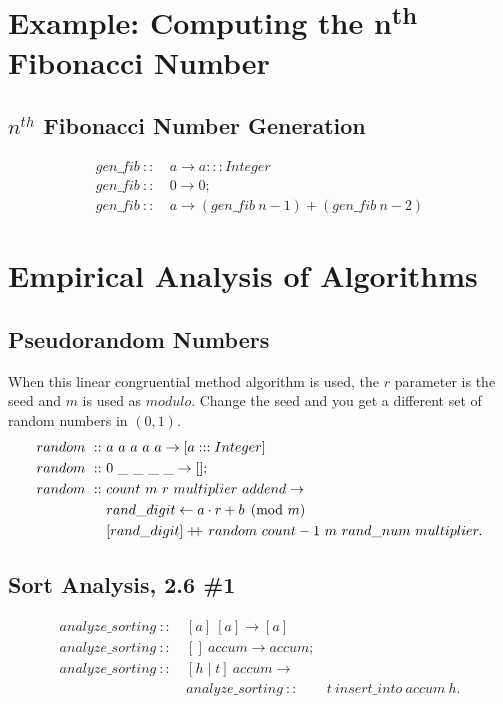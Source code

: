 \documentclass[a4paper,10pt]{book}
\newcommand\doubleplus{+\kern-1.3ex+\kern0.8ex}
\begin{document}
\section{Example: Computing the n\textsuperscript{th} Fibonacci Number}

\subsection{$n^{th}$ Fibonacci Number Generation}

\begin{align*}
gen\_fib\ ::\ &a\rightarrow a:::Integer\\
gen\_fib\ ::\ &0\rightarrow 0;\\
gen\_fib\ ::\ &a\rightarrow (gen\_fib\ n-1) + (gen\_fib\ n-2)
\end{align*}

\section{Empirical Analysis of Algorithms}
\subsection{Pseudorandom Numbers}

When this linear congruential method algorithm is used, the $r$ parameter is the seed and $m$ is used as $modulo$. Change the seed and you get a different set of random numbers in $(0,1)$.
\begin{align*}
random\ ::\ &a\ a\ a\ a\ a\rightarrow [a:::Integer]\\
random\ ::\ &0\ \_\ \_\ \_\ \_\rightarrow [];\\
random\ ::\ &count\ m\ r\ multiplier\ addend\rightarrow \\
&rand\_digit\leftarrow a\cdot r+b\pmod{m}\\
&[rand\_digit]\doubleplus random\ count-1\ m\ rand\_num\ multiplier.
\end{align*}

\subsection{Sort Analysis, 2.6 \#1}
\begin{align*}
analyze\_sorting\ ::\ &[a]\ [a]\rightarrow [a]\\
analyze\_sorting\ ::\ &[]\ accum\rightarrow accum;\\
analyze\_sorting\ ::\ &[h\mid t]\ accum\rightarrow \\
	&analyze\_sorting\ ::\ &t\ insert\_into\ accum\ h.
\end{align*}
\end{document}
